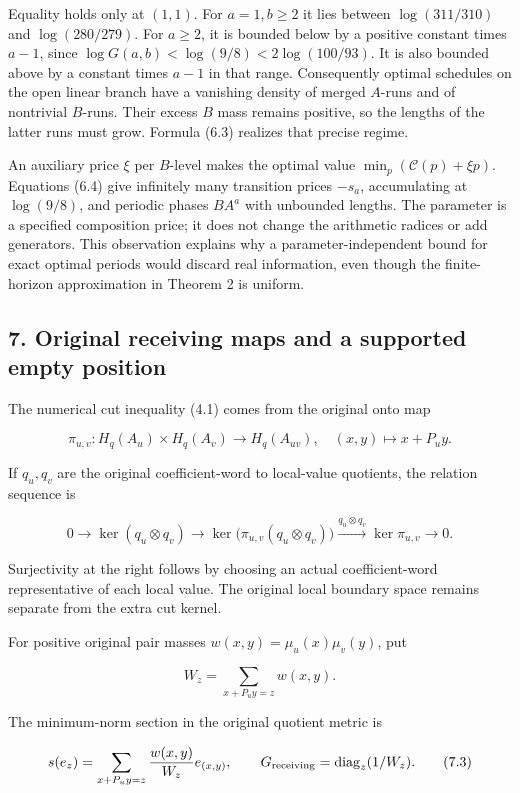 \documentclass[11pt,a4paper]{article}
\begin{document}
Equality holds only at \((1,1)\). For \(a=1,b\ge2\) it lies between \(\log(311/310)\) and \(\log(280/279)\). For \(a\ge2\), it is bounded below by a positive constant times \(a-1\), since \(\log G(a,b)<\log(9/8)<2\log(100/93)\). It is also bounded above by a constant times \(a-1\) in that range. Consequently optimal schedules on the open linear branch have a vanishing density of merged \(A\)-runs and of nontrivial \(B\)-runs. Their excess \(B\) mass remains positive, so the lengths of the latter runs must grow. Formula (6.3) realizes that precise regime.

An auxiliary price \(\xi\) per \(B\)-level makes the optimal value \(\min_p(\mathcal C(p)+\xi p)\). Equations (6.4) give infinitely many transition prices \(-s_a\), accumulating at \(\log(9/8)\), and periodic phases \(BA^a\) with unbounded lengths. The parameter is a specified composition price; it does not change the arithmetic radices or add generators. This observation explains why a parameter-independent bound for exact optimal periods would discard real information, even though the finite-horizon approximation in Theorem 2 is uniform.

\subsection{7. Original receiving maps and a supported empty position}\label{eporig:original-receiving-maps-and-a-supported-empty-position}

The numerical cut inequality (4.1) comes from the original onto map

\[
\pi_{u,v}:H_q(A_u)\times H_q(A_v)\to H_q(A_{uv}),
\quad(x,y)\mapsto x+P_uy.
\tag{7.1}
\]

If \(q_u,q_v\) are the original coefficient-word to local-value quotients, the relation sequence is

\[
0\to\ker(q_u\otimes q_v)
\to\ker\bigl(\pi_{u,v}(q_u\otimes q_v)\bigr)
\xrightarrow{q_u\otimes q_v}\ker\pi_{u,v}\to0.
\tag{7.2}
\]

Surjectivity at the right follows by choosing an actual coefficient-word representative of each local value. The original local boundary space remains separate from the extra cut kernel.

For positive original pair masses \(w(x,y)=\mu_u(x)\mu_v(y)\), put

\[
W_z=\sum_{x+P_uy=z}w(x,y).
\]

The minimum-norm section in the original quotient metric is

\[
s(e_z)=\sum_{x+P_uy=z}\frac{w(x,y)}{W_z}e_{(x,y)},
\qquad G_{\rm receiving}=\operatorname{diag}_z(1/W_z).
\tag{7.3}
\]
\end{document}
